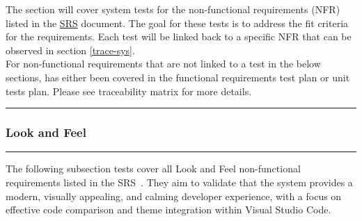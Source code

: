 \documentclass[12pt, titlepage]{article}
\newcommand{\SRS}{\href{https://github.com/ssm-lab/capstone--source-code-optimizer/blob/main/docs/SRS/SRS.pdf}{SRS}}
\newcommand{\colorrule}{\textcolor{BlueViolet}{\rule{\linewidth}{2pt}}}
\begin{document}
The section will cover system tests for the non-functional
requirements (NFR) listed in the \SRS \hspace{1pt}
document\cite{SRS}. The goal for these tests is to address the fit
criteria for the requirements. Each test will be linked back to a
specific NFR that can be observed in section \ref{trace-sys}.\\

\noindent For non-functional requirements that are not linked to a test in the below sections, has either been covered in the functional requirements test plan or unit tests plan. Please see traceability matrix for more details.

\noindent\colorrule

\subsubsection{Look and Feel}
\colorrule

\medskip

\noindent
The following subsection tests cover all Look and Feel non-functional
requirements listed in the SRS~\cite{SRS}. They aim to validate that
the system provides a modern, visually appealing, and calming
developer experience, with a focus on effective code comparison and
theme integration within Visual Studio Code.
\end{document}
